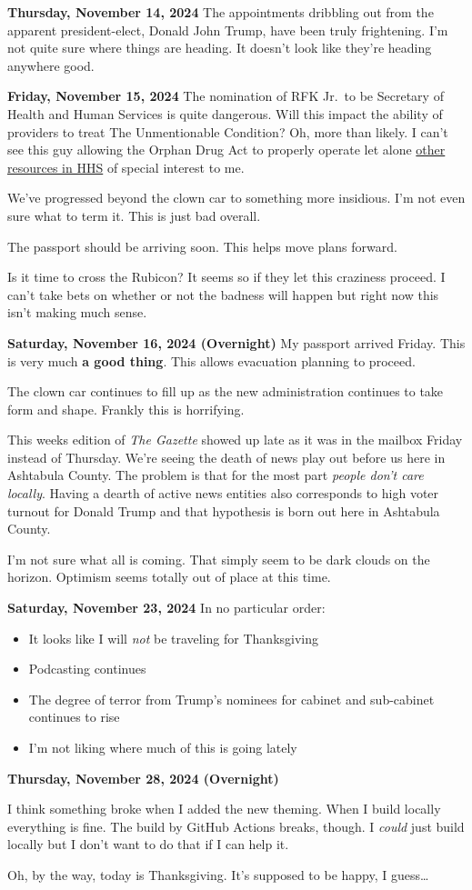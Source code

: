 \textbf{Thursday, November 14, 2024}
The appointments dribbling out from the apparent president-elect, Donald
John Trump, have been truly frightening. I'm not quite sure where things
are heading. It doesn't look like they're heading anywhere good.

\textbf{Friday, November 15, 2024}
The nomination of RFK Jr.~to be Secretary of Health and Human Services
is quite dangerous. Will this impact the ability of providers to treat
The Unmentionable Condition? Oh, more than likely. I can't see this guy
allowing the Orphan Drug Act to properly operate let alone
\href{https://rarediseases.info.nih.gov/resources}{other resources in
HHS} of special interest to me.

We've progressed beyond the clown car to something more insidious. I'm
not even sure what to term it. This is just bad overall.

The passport should be arriving soon. This helps move plans forward.

Is it time to cross the Rubicon? It seems so if they let this craziness
proceed. I can't take bets on whether or not the badness will happen but
right now this isn't making much sense.

\textbf{Saturday, November 16, 2024
(Overnight)}
My passport arrived Friday. This is very much \textbf{a good thing}.
This allows evacuation planning to proceed.

The clown car continues to fill up as the new administration continues
to take form and shape. Frankly this is horrifying.

This weeks edition of \emph{The Gazette} showed up late as it was in the
mailbox Friday instead of Thursday. We're seeing the death of news play
out before us here in Ashtabula County. The problem is that for the most
part \emph{people don't care locally}. Having a dearth of active news
entities also corresponds to high voter turnout for Donald Trump and
that hypothesis is born out here in Ashtabula County.

I'm not sure what all is coming. That simply seem to be dark clouds on
the horizon. Optimism seems totally out of place at this time.

\textbf{Saturday, November 23, 2024}
In no particular order:

\begin{itemize}
\item
  It looks like I will \emph{not} be traveling for Thanksgiving
\item
  Podcasting continues
\item
  The degree of terror from Trump's nominees for cabinet and sub-cabinet
  continues to rise
\item
  I'm not liking where much of this is going lately
\end{itemize}

\textbf{Thursday, November 28, 2024
(Overnight)}

I think something broke when I added the new theming. When I build
locally everything is fine. The build by GitHub Actions breaks, though.
I \emph{could} just build locally but I don't want to do that if I can
help it.

Oh, by the way, today is Thanksgiving. It's supposed to be happy, I
guess\ldots{}
